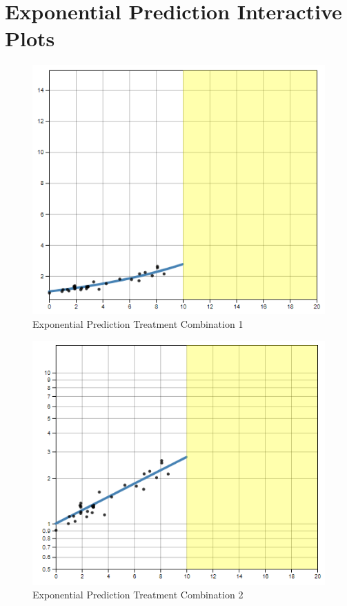 \documentclass[print]{nuthesis}
\begin{document}
\hypertarget{exponential-prediction-plots}{%
\chapter{Exponential Prediction Interactive Plots}\label{exponential-prediction-plots}}

\begin{figure}[tbp]

{\centering \includegraphics[width=0.75\linewidth,]{images/low-10-linear} 

}

\caption{Exponential Prediction Treatment Combination 1}\label{fig:low-10-linear}
\end{figure}

\begin{figure}[tbp]

{\centering \includegraphics[width=0.75\linewidth,]{images/low-10-log} 

}

\caption{Exponential Prediction Treatment Combination 2}\label{fig:low-10-log}
\end{figure}
\end{document}
